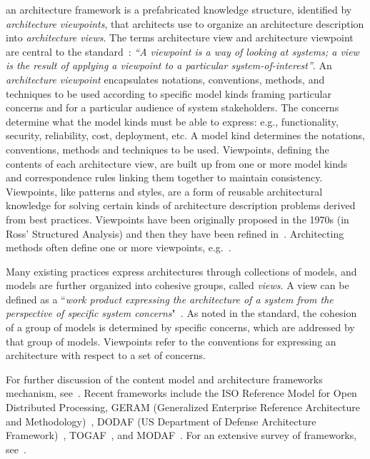  an architecture framework is a prefabricated knowledge structure, identified by {\em architecture viewpoints}, that
architects use to organize an architecture description into {\em architecture views}.  The terms architecture view and architecture viewpoint are central to the standard~\cite{42010}:
{\em ``A viewpoint is a way of looking at systems; a view is the result of applying a viewpoint to a particular
system-of-interest''}. 
An {\em architecture viewpoint} encapsulates notations, conventions, methods, and techniques to
be used according to specific 
model kinds framing particular
concerns and for a particular audience of system stakeholders. 
The
concerns determine what the model kinds must be able to express: e.g.,
functionality, security, reliability, cost, deployment, etc.  
A model
kind determines the notations, conventions, methods and techniques to
be used. 
Viewpoints, defining the contents of each architecture view,
are built up from one or more model kinds and correspondence rules
linking them together to maintain consistency.
Viewpoints, like patterns and styles, are a form of reusable
architectural knowledge for solving certain kinds of architecture
description problems derived from best practices.  
Viewpoints
have been originally proposed in the 1970s (in Ross' Structured Analysis) and then they have been refined in~\cite{Finkelstein+92}. Architecting methods often define one or
more viewpoints, e.g.~\cite{4+1,RozWooBook,ClementsBachmannEtAl03, Eeles-Cripps:2010}.


Many existing practices express architectures through collections of
models, and models are further organized into cohesive groups, called {\em views}. A view can be defined as a ``{\em work product expressing the architecture of a system from the perspective of specific system concerns}"~\cite{42010}.
As noted in the standard, the cohesion of a
group of models is determined by specific concerns, which are addressed by that group of models. Viewpoints refer to the conventions
for expressing an architecture with respect to a set of concerns.

For further discussion of the
content model and architecture frameworks mechanism,
see~\cite{Emery-Hilliard:2009}. 
Recent
frameworks include the ISO Reference Model for Open Distributed
Processing, GERAM (Generalized Enterprise Reference Architecture
and Methodology)~\cite{ISO15704}, DODAF (US Department of Defense Architecture
Framework)~\cite{DODAF}, TOGAF~\cite{TOGAF}, and MODAF~\cite{MODAF}. 
For an extensive survey of
frameworks, see~\cite{AFS}. 
    


